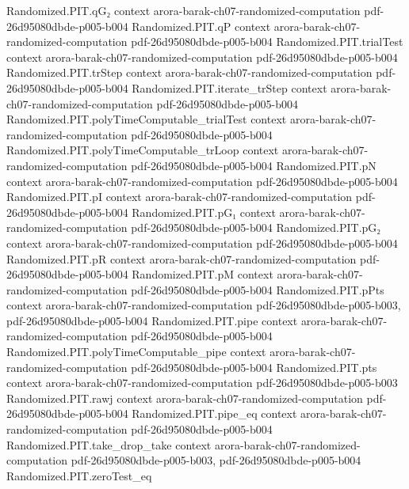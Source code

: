 \begin{theorem}
\proofstep
  {Randomized.PIT.qG₂}
  {context}
  {arora-barak-ch07-randomized-computation}
  {pdf-26d95080dbde-p005-b004}
\proofstep
  {Randomized.PIT.qP}
  {context}
  {arora-barak-ch07-randomized-computation}
  {pdf-26d95080dbde-p005-b004}
\proofstep
  {Randomized.PIT.trialTest}
  {context}
  {arora-barak-ch07-randomized-computation}
  {pdf-26d95080dbde-p005-b004}
\proofstep
  {Randomized.PIT.trStep}
  {context}
  {arora-barak-ch07-randomized-computation}
  {pdf-26d95080dbde-p005-b004}
\proofstep
  {Randomized.PIT.iterate_trStep}
  {context}
  {arora-barak-ch07-randomized-computation}
  {pdf-26d95080dbde-p005-b004}
\proofstep
  {Randomized.PIT.polyTimeComputable_trialTest}
  {context}
  {arora-barak-ch07-randomized-computation}
  {pdf-26d95080dbde-p005-b004}
\proofstep
  {Randomized.PIT.polyTimeComputable_trLoop}
  {context}
  {arora-barak-ch07-randomized-computation}
  {pdf-26d95080dbde-p005-b004}
\proofstep
  {Randomized.PIT.pN}
  {context}
  {arora-barak-ch07-randomized-computation}
  {pdf-26d95080dbde-p005-b004}
\proofstep
  {Randomized.PIT.pI}
  {context}
  {arora-barak-ch07-randomized-computation}
  {pdf-26d95080dbde-p005-b004}
\proofstep
  {Randomized.PIT.pG₁}
  {context}
  {arora-barak-ch07-randomized-computation}
  {pdf-26d95080dbde-p005-b004}
\proofstep
  {Randomized.PIT.pG₂}
  {context}
  {arora-barak-ch07-randomized-computation}
  {pdf-26d95080dbde-p005-b004}
\proofstep
  {Randomized.PIT.pR}
  {context}
  {arora-barak-ch07-randomized-computation}
  {pdf-26d95080dbde-p005-b004}
\proofstep
  {Randomized.PIT.pM}
  {context}
  {arora-barak-ch07-randomized-computation}
  {pdf-26d95080dbde-p005-b004}
\proofstep
  {Randomized.PIT.pPts}
  {context}
  {arora-barak-ch07-randomized-computation}
  {pdf-26d95080dbde-p005-b003,
    pdf-26d95080dbde-p005-b004}
\proofstep
  {Randomized.PIT.pipe}
  {context}
  {arora-barak-ch07-randomized-computation}
  {pdf-26d95080dbde-p005-b004}
\proofstep
  {Randomized.PIT.polyTimeComputable_pipe}
  {context}
  {arora-barak-ch07-randomized-computation}
  {pdf-26d95080dbde-p005-b004}
\proofstep
  {Randomized.PIT.pts}
  {context}
  {arora-barak-ch07-randomized-computation}
  {pdf-26d95080dbde-p005-b003}
\proofstep
  {Randomized.PIT.rawj}
  {context}
  {arora-barak-ch07-randomized-computation}
  {pdf-26d95080dbde-p005-b004}
\proofstep
  {Randomized.PIT.pipe_eq}
  {context}
  {arora-barak-ch07-randomized-computation}
  {pdf-26d95080dbde-p005-b004}
\proofstep
  {Randomized.PIT.take_drop_take}
  {context}
  {arora-barak-ch07-randomized-computation}
  {pdf-26d95080dbde-p005-b003,
    pdf-26d95080dbde-p005-b004}
\proofstep
  {Randomized.PIT.zeroTest_eq}

\end{theorem}
